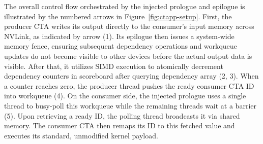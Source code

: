 The overall control flow orchestrated by the injected prologue and epilogue is illustrated by the numbered arrows in Figure~\ref{fig:ctapp-setup}. First, the producer CTA writes its output directly to the consumer's input memory across NVLink, as indicated by arrow (1). Its epilogue then issues a system-wide memory fence, ensuring subsequent dependency operations and workqueue updates do not become visible to other devices before the actual output data is visible. After that, it utilizes SIMD execution to atomically decrement dependency counters in scoreboard after querying dependency array (2, 3). When a counter reaches zero, the producer thread pushes the ready consumer CTA ID into workqueue (4). On the consumer side, the injected prologue uses a single thread to busy-poll this workqueue while the remaining threads wait at a barrier (5). Upon retrieving a ready ID, the polling thread broadcasts it via shared memory. The consumer CTA then remaps its ID to this fetched value and executes its standard, unmodified kernel payload.




